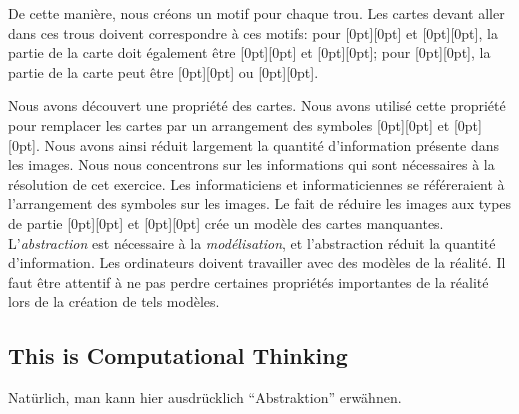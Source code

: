 \documentclass[a4paper,11pt]{report}
\newcommand{\taskGraphicsFolder}{..}
\begin{document}
De cette manière, nous créons un motif pour chaque trou. Les cartes devant aller dans ces trous doivent correspondre à ces motifs: pour \raisebox{-0.5ex}[0pt][0pt]{} et \raisebox{-0.5ex}[0pt][0pt]{}, la partie de la carte doit également être \raisebox{-0.5ex}[0pt][0pt]{} et \raisebox{-0.5ex}[0pt][0pt]{}; pour \raisebox{-0.5ex}[0pt][0pt]{}, la partie de la carte peut être \raisebox{-0.5ex}[0pt][0pt]{} ou \raisebox{-0.5ex}[0pt][0pt]{}.

Nous avons découvert une propriété des cartes. Nous avons utilisé cette propriété pour remplacer les cartes par un arrangement des symboles \raisebox{-0.5ex}[0pt][0pt]{} et \raisebox{-0.5ex}[0pt][0pt]{}. Nous avons ainsi réduit largement la quantité d’information présente dans les images. Nous nous concentrons sur les informations qui sont nécessaires à la résolution de cet exercice. Les informaticiens et informaticiennes se référeraient à l’arrangement des symboles sur les images. Le fait de réduire les images aux types de partie \raisebox{-0.5ex}[0pt][0pt]{} et \raisebox{-0.5ex}[0pt][0pt]{} crée un modèle des cartes manquantes. L’\emph{abstraction} est nécessaire à la \emph{modélisation}, et l’abstraction réduit la quantité d’information. Les ordinateurs doivent travailler avec des modèles de la réalité. Il faut être attentif à ne pas perdre certaines propriétés importantes de la réalité lors de la création de tels modèles.


\subsection*{This is Computational Thinking}

Natürlich, man kann hier ausdrücklich “Abstraktion” erwähnen.
\end{document}
